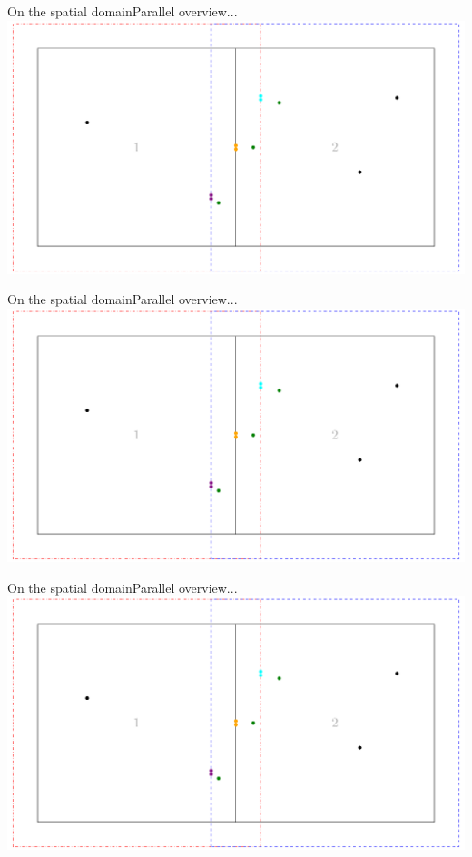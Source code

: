 \documentclass{beamer}
\begin{document}
\begin{frame}{On the spatial domain}{Parallel overview...}
    \centering
    \includegraphics[page=1,width=\textwidth]{figures/merge}
\end{frame}

\begin{frame}{On the spatial domain}{Parallel overview...}
    \centering
    \includegraphics[page=2,width=\textwidth]{figures/merge}
\end{frame}

\begin{frame}{On the spatial domain}{Parallel overview...}
    \centering
    \includegraphics[page=3,width=\textwidth]{figures/merge}
\end{frame}
\end{document}
